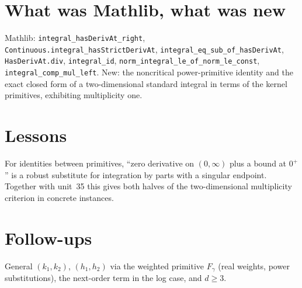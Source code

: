 \documentclass[11pt]{article}
\begin{document}
\section{What was Mathlib, what was new}
Mathlib: \texttt{integral\_hasDerivAt\_right}, \texttt{Continuous.integral\_hasStrictDerivAt},
\texttt{integral\_eq\_sub\_of\_hasDerivAt}, \texttt{HasDerivAt.div}, \texttt{integral\_id},
\texttt{norm\_integral\_le\_of\_norm\_le\_const}, \texttt{integral\_comp\_mul\_left}. New: the noncritical
power-primitive identity and the exact closed form of a two-dimensional standard integral in terms of
the kernel primitives, exhibiting multiplicity one.

\section{Lessons}
For identities between primitives, ``zero derivative on $(0,\infty)$ plus a bound at $0^+$'' is a robust
substitute for integration by parts with a singular endpoint. Together with unit~35 this gives both
halves of the two-dimensional multiplicity criterion in concrete instances.

\section{Follow-ups}
General $(k_1,k_2)$, $(h_1,h_2)$ via the weighted primitive $F_\gamma$ (real weights, power
substitutions), the next-order term in the log case, and $d\ge3$.
\end{document}
